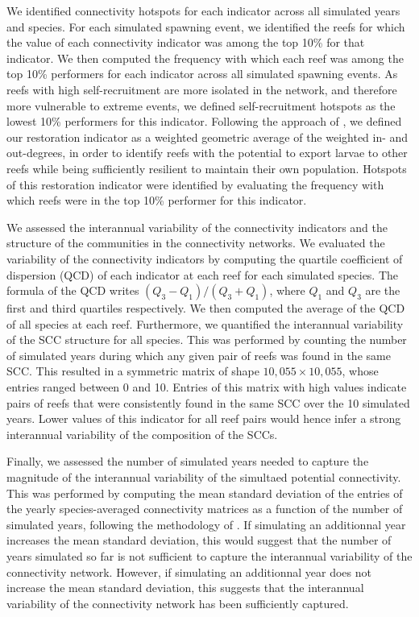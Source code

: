 \documentclass[preprint,12pt,authoryear]{elsarticle}
\begin{document}
We identified connectivity hotspots for each indicator across all simulated years and species. For each simulated spawning event, we identified the reefs for which the value of each connectivity indicator was among the top 10\% for that indicator. We then computed the frequency with which each reef was among the top 10\% performers for each indicator across all simulated spawning events. As reefs with high self-recruitment are more isolated in the network, and therefore more vulnerable to extreme events, we defined self-recruitment hotspots as the lowest 10\% performers for this indicator. Following the approach of \cite{tnc2024}, we defined our restoration indicator as a weighted geometric average of the weighted in- and out-degrees, in order to identify reefs with the potential to export larvae to other reefs while being sufficiently resilient to maintain their own population. Hotspots of this restoration indicator were identified by evaluating the frequency with which reefs were in the top 10\% performer for this indicator.

We assessed the interannual variability of the connectivity indicators and the structure of the communities in the connectivity networks. We evaluated the variability of the connectivity indicators by computing the quartile coefficient of dispersion (QCD) of each indicator at each reef for each simulated species. The formula of the QCD writes $(Q_3-Q_1) / (Q_3+Q_1)$, where $Q_1$ and $Q_3$ are the first and third quartiles respectively. We then computed the average of the QCD of all species at each reef. Furthermore, we quantified the interannual variability of the SCC structure for all species. This was performed by counting the number of simulated years during which any given pair of reefs was found in the same SCC. This resulted in a symmetric matrix of shape $10,055 \times 10,055$, whose entries ranged between 0 and 10. Entries of this matrix with high values indicate pairs of reefs that were consistently found in the same SCC over the 10 simulated years. Lower values of this indicator for all reef pairs would hence infer a strong interannual variability of the composition of the SCCs.

Finally, we assessed the number of simulated years needed to capture the magnitude of the interannual variability of the simultaed potential connectivity. This was performed by computing the mean standard deviation of the entries of the yearly species-averaged connectivity matrices as a function of the number of simulated years, following the methodology of \cite{thompson2018variability}. If simulating an additionnal year increases the mean standard deviation, this would suggest that the number of years simulated so far is not sufficient to capture the interannual variability of the connectivity network. However, if simulating an additionnal year does not increase the mean standard deviation, this suggests that the interannual variability of the connectivity network has been sufficiently captured.
\end{document}
